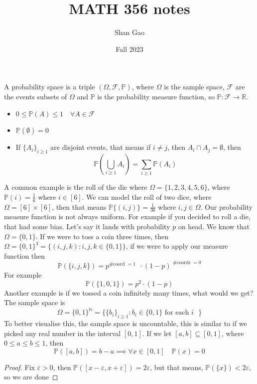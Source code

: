 \documentclass{tufte-handout}
\title{MATH 356 notes}
\author{Shan Gao}
\date{Fall 2023}
\begin{document}
	\maketitle
	\begin{definition}
		A probability space is a triple $(\Omega, \mathcal{F}, \mathbb{P})$, where $\Omega$ is the sample space, $\mathcal{F}$ are the events subsets of $\Omega$ and $\mathbb{P}$ is the probability measure function, so $\mathbb{P} \colon \mathcal{F} \to \mathbb{R}$.  

		
	\end{definition}
	\begin{definition}
		\begin{itemize}
			\item $ 0 \leq \mathbb{P}(A) \leq 1 \quad \forall A \in \mathcal{F}$ 
			\item $\mathbb{P}(\emptyset) = 0$
			\item If $\{A_i\}_{i \geq 1}$ are disjoint events, that means if $i \neq j$, then $A_i \cap A_j = \emptyset$, then 
				\[\mathbb{P} \left( \bigcup_{i \geq 1} A_i \right) = \sum_{i \geq1} \mathbb{P}(A_i)\]
		\end{itemize}	
	\end{definition}
	A common example is the roll of the die where $\Omega = \{1,2,3,4,5,6\}$, where $\mathbb{P}(i) = \frac{1}{6}$ where $i \in [6]$.
	We can model the roll of two dice, where $\Omega = [6] \times [6]$, then that means $\mathbb{P}\{(i,j)\} = \frac{1}{36}$ where $i,j \in \Omega$.
	Our probability measure function is not always uniform. For example if you decided to roll a die, that had some bias. Let's say it lands with probability $p$ on head. We know that $\Omega = \{0,1\}$. If we were to toss a coin three times, then $\Omega = \{0,1\}^3 = \{(i,j,k) \colon i,j,k \in \{0,1\}\}$, if we were to apply our measure function then 
	\[\mathbb{P} \left( \{i,j,k\} \right) = p^\text{\# coord $=1$ } \cdot (1-p)^\text{ \# coords $=0$}\]
	For example 
	\[\mathbb{P} \left( \{1,0,1\} \right) = p^2\cdot (1-p)\]
	Another example is if we tossed a coin infinitely many times, what would we get? 
	The sample space is $$\Omega = \{0,1\}^\mathbb{N} = \big\{\{b_i\}_{i \geq 1} \colon b_i \in \{0,1\} \text{ for each $i$ } \big\}$$
	To better visualise this, the sample space is uncountable, this is similar to if we picked any real number in the interval $[0,1]$. If we let $[a,b] \subseteq [0,1]$, where $0\leq a\leq b \leq 1$, then 
	\[\mathbb{P}([a,b]) = b-a \implies \forall x \in [0,1] \quad \mathbb{P}(x) = 0\]
	\begin{proof}
		Fix $\varepsilon > 0$, then $\mathbb{P}([x-\varepsilon, x + \varepsilon]) = 2\varepsilon$, but that means, $\mathbb{P}(\{x\}) < 2\varepsilon$, so we are done
	\end{proof}
\end{document}
